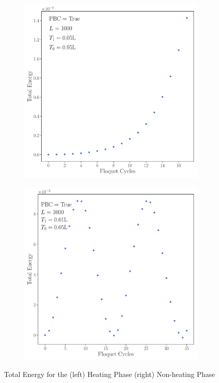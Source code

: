 \documentclass[11pt, a4paper]{article}
\theoremstyle{definition} %
\begin{document}
	
	\begin{figure}[h]
	\centering
		\begin{subfigure}[b]{0.49\textwidth}
			\includegraphics[width=\textwidth]{Total_Energy1d_heating.pdf}
		\end{subfigure}
		\begin{subfigure}[b]{0.49\textwidth}
			\includegraphics[width=\textwidth]{Total_Energy1d_nonheating.pdf}
		\end{subfigure}
		\caption{Total Energy for the (left) Heating Phase (right) Non-heating Phase}
	\end{figure}	
	
\end{document}
